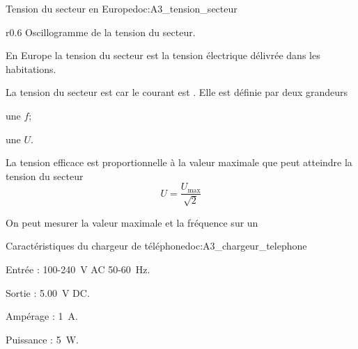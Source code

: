 \begin{doc}{Tension du secteur en Europe}{doc:A3_tension_secteur}
\begin{wrapfigure}[15]{r}{0.6\linewidth}
    Oscillogramme de la tension du secteur.
  \end{wrapfigure}
  
  En Europe la tension du secteur est la tension électrique délivrée dans les habitations.

  La tension du secteur est  car le courant est .
  Elle est définie par deux grandeurs 
  \begin{listePoints}
    \item une  $f$;
    \item une  $U$.
  \end{listePoints}

  La tension efficace est proportionnelle à la valeur maximale que peut atteindre la tension du secteur 
  \begin{equation*}
    U = \dfrac{U_\text{max}}{\sqrt{2}}
  \end{equation*}

  On peut mesurer la valeur maximale et la fréquence sur un 
\end{doc}





\begin{doc}{Caractéristiques du chargeur de téléphone}{doc:A3_chargeur_telephone}
  \begin{listePoints}[2]
    \item Entrée : 100-\qty{240}{\volt} AC 50-\qty{60}{\hertz}.
    \item Sortie : \qty{5,00}{\volt} DC.
    \item Ampérage : \qty{1}{\ampere}.
    \item Puissance : \qty{5}{\watt}.
  \end{listePoints}
\end{doc}

